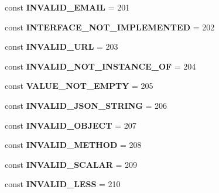 \begin{DoxyCompactItemize}
const {\bfseries I\+N\+V\+A\+L\+I\+D\+\_\+\+E\+M\+A\+IL} = 201
\item 
\mbox{\label{class_assert_1_1_assertion_a8960dba5d29e689f23844e3c5c59b1eb}} 
const {\bfseries I\+N\+T\+E\+R\+F\+A\+C\+E\+\_\+\+N\+O\+T\+\_\+\+I\+M\+P\+L\+E\+M\+E\+N\+T\+ED} = 202
\item 
\mbox{\label{class_assert_1_1_assertion_a1e3b8772d5fe7f0c890d9e20fa1cc1dd}} 
const {\bfseries I\+N\+V\+A\+L\+I\+D\+\_\+\+U\+RL} = 203
\item 
\mbox{\label{class_assert_1_1_assertion_aeb5677bace9004cfea2c32d96396d342}} 
const {\bfseries I\+N\+V\+A\+L\+I\+D\+\_\+\+N\+O\+T\+\_\+\+I\+N\+S\+T\+A\+N\+C\+E\+\_\+\+OF} = 204
\item 
\mbox{\label{class_assert_1_1_assertion_a08d9dc3f47f1326ea1b43ac0f58a9b08}} 
const {\bfseries V\+A\+L\+U\+E\+\_\+\+N\+O\+T\+\_\+\+E\+M\+P\+TY} = 205
\item 
\mbox{\label{class_assert_1_1_assertion_a86a3864595c9462c4012a20916a3be3d}} 
const {\bfseries I\+N\+V\+A\+L\+I\+D\+\_\+\+J\+S\+O\+N\+\_\+\+S\+T\+R\+I\+NG} = 206
\item 
\mbox{\label{class_assert_1_1_assertion_a8b5de55a6663a548770c3b956fd935e2}} 
const {\bfseries I\+N\+V\+A\+L\+I\+D\+\_\+\+O\+B\+J\+E\+CT} = 207
\item 
\mbox{\label{class_assert_1_1_assertion_a240196fcd9af57c3910e63d400190510}} 
const {\bfseries I\+N\+V\+A\+L\+I\+D\+\_\+\+M\+E\+T\+H\+OD} = 208
\item 
\mbox{\label{class_assert_1_1_assertion_a56087b658ca10e73614d6ea6a232f642}} 
const {\bfseries I\+N\+V\+A\+L\+I\+D\+\_\+\+S\+C\+A\+L\+AR} = 209
\item 
\mbox{\label{class_assert_1_1_assertion_a101f52035db0c84133df18027ba08cc3}} 
const {\bfseries I\+N\+V\+A\+L\+I\+D\+\_\+\+L\+E\+SS} = 210
\item 
\mbox{\label{class_assert_1_1_assertion_ab04ca26c2f8c789a09bf5c5e5fa8ca71}} 

\end{DoxyCompactItemize}
